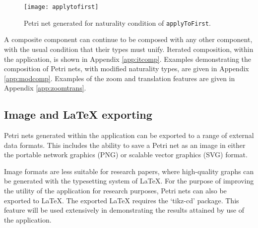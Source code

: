 \documentclass[../Dissertation.tex]{subfiles}
\begin{document}
\begin{figure}[H]
\begin{center}
\texttt{[image: applytofirst]}
\end{center}
\caption{Petri net generated for naturality condition of \lstinline{applyToFirst}.}
\label{fig:applytofirstimg}
\end{figure}

A composite component can continue to be composed with any other component, with the usual condition that their types must unify. Iterated composition, within the application, is shown in Appendix \ref{app:itcomp}. Examples demonstrating the composition of Petri nets, with modified naturality types, are given in Appendix \ref{app:modcomp}. Examples of the zoom and translation features are given in Appendix \ref{app:zoomtrans}.

\subsection{Image and LaTeX exporting}
Petri nets generated within the application can be exported to a range of external data formats. This includes the ability to save a Petri net as an image in either the portable network graphics (PNG) or scalable vector graphics (SVG) format.
\par
Image formats are less suitable for research papers, where high-quality graphs can be generated with the typesetting system of LaTeX. For the purpose of improving the utility of the application for research purposes, Petri nets can also be exported to LaTeX. The exported LaTeX requires the `tikz-cd' package. This feature will be used extensively in demonstrating the results attained by use of the application.
\end{document}
